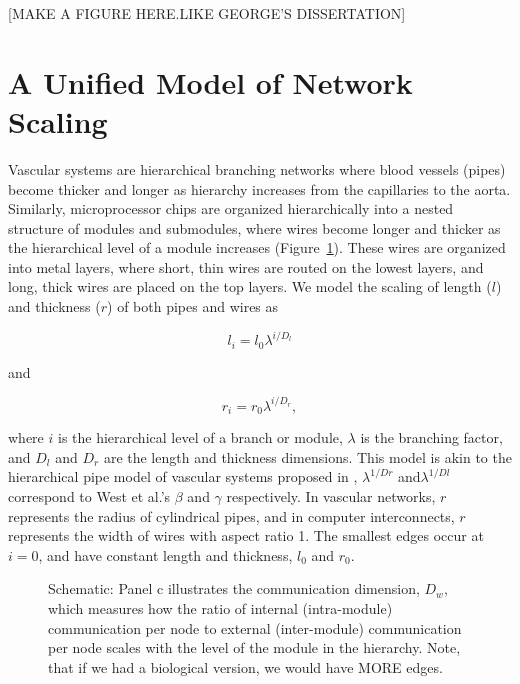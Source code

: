 \documentclass[12pt]{article}
\begin{document}
[MAKE A FIGURE HERE.LIKE GEORGE'S DISSERTATION]

\section{A Unified Model of Network Scaling}
\label{sec:unified-model}


Vascular systems are hierarchical branching networks where blood vessels
(pipes) become thicker and longer as hierarchy increases from the capillaries
to the aorta. Similarly, microprocessor chips are organized hierarchically into
a nested structure of modules and submodules, where wires become longer and
thicker as the hierarchical level of a module increases
(Figure~\ref{fig:model-schematic}).  These wires are organized into metal
layers, where short, thin wires are routed on the lowest layers, and long,
thick wires are placed on the top layers. We model the scaling of length ($l$)
and thickness ($r$) of both pipes and wires as

\begin{equation}
l_i = l_0 \lambda^{i/D_l}
\end{equation}

\noindent and

\begin{equation}
r_i = r_0 \lambda^{i/D_r},
\label{eq:rscaling}
\end{equation}

\noindent where $i$ is the hierarchical level of a branch or module, $\lambda$
is the branching factor, and $D_l$ and $D_r$ are the length and thickness
dimensions. This model is akin to the hierarchical pipe model of vascular
systems proposed in \cite{west97}, $\lambda^{1/Dr}$ and$\lambda^{1/Dl}$
correspond to West et al.'s $\beta$ and $\gamma$ respectively.
In vascular networks, $r$ represents the radius of cylindrical pipes, and in
computer interconnects, $r$ represents the width of wires with aspect ratio 1.
The smallest edges occur at $i = 0$, and have constant length and thickness,
$l_0$ and $r_0$. 

\begin{figure}
\caption{Schematic: Panel c illustrates the communication dimension, $D_w$,
  which measures how the ratio of internal (intra-module) communication per node to
  external (inter-module) communication per node scales with the level of the module in
  the hierarchy. Note, that if we had a biological version, we would
  have MORE edges.}
  \label{fig:model-schematic}
\end{figure}
\end{document}
